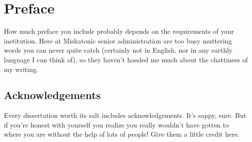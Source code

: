 \chapter{Preface}
How much preface you include probably depends on the requirements of your
institution. Here at Miskatonic senior administration are too busy muttering
words you can never quite catch (certainly not in English, nor in any earthly
language I can think of), so they haven't hassled me much about the chattiness
of my writing.


\section*{Acknowledgements}
Every dissertation worth its salt includes acknowledgements. It's sappy, sure.
But if you're honest with yourself you realize you really wouldn't have gotten
to where you are without the help of lots of people! Give them a little credit
here.